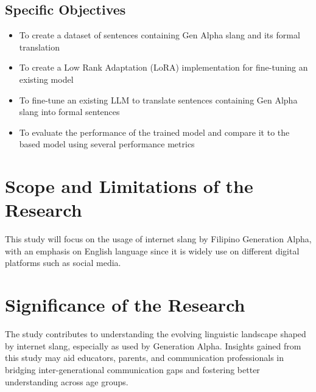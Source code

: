 \subsection{Specific Objectives}
\label{sec:specific_objectives}
\begin{itemize}
	\item To create a dataset of sentences containing Gen Alpha slang and its formal translation
	\item To create a Low Rank Adaptation (LoRA) implementation for fine-tuning an existing model
	\item To fine-tune an existing LLM to translate sentences containing Gen Alpha slang into formal sentences
	\item To evaluate the performance of the trained model and compare it to the based model using several performance metrics
\end{itemize}

\section{Scope and Limitations of the Research}
\label{sec:scope}
This study will focus on the usage of internet slang by Filipino Generation Alpha, with an emphasis on English language since it is widely use on different digital platforms such as social media.

\section{Significance of the Research}
\label{sec:significance}
The study contributes to understanding the evolving linguistic landscape shaped by internet slang, especially as used by Generation Alpha. Insights gained from this study may aid educators, parents, and communication professionals in bridging inter-generational communication gaps and fostering better understanding across age groups.